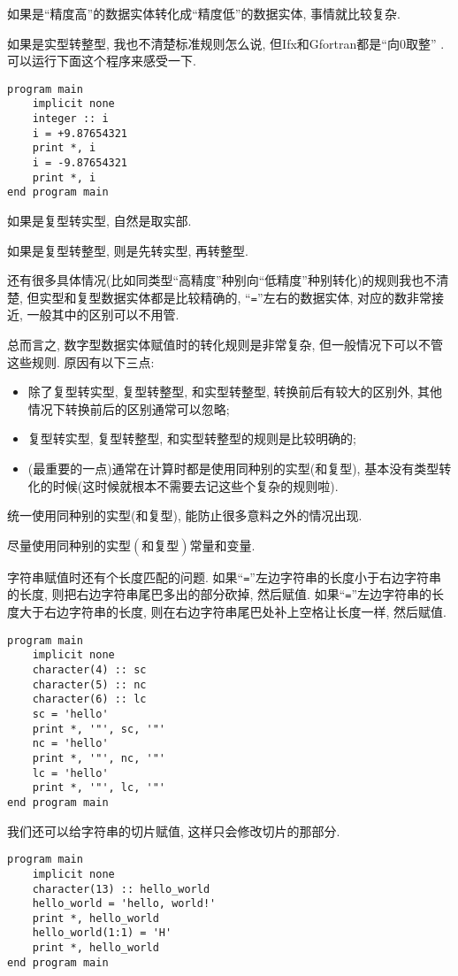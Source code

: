 如果是``精度高''的数据实体转化成``精度低''的数据实体, 事情就比较复杂.

如果是实型转整型, 我也不清楚标准规则怎么说, 但Ifx和Gfortran都是``向0取整'' . 可以运行下面这个程序来感受一下.
\begin{lstlisting}
program main
    implicit none
    integer :: i
    i = +9.87654321
    print *, i
    i = -9.87654321
    print *, i
end program main
\end{lstlisting}

如果是复型转实型, 自然是取实部.

如果是复型转整型, 则是先转实型, 再转整型.

还有很多具体情况(比如同类型``高精度''种别向``低精度''种别转化)的规则我也不清楚, 但实型和复型数据实体都是比较精确的, ``\texttt{=}''左右的数据实体, 对应的数非常接近, 一般其中的区别可以不用管.

总而言之, 数字型数据实体赋值时的转化规则是非常复杂, 但一般情况下可以不管这些规则. 原因有以下三点:
\begin{itemize}
    \item 除了复型转实型, 复型转整型, 和实型转整型, 转换前后有较大的区别外, 其他情况下转换前后的区别通常可以忽略;
    \item 复型转实型, 复型转整型, 和实型转整型的规则是比较明确的;
    \item (最重要的一点)通常在计算时都是使用同种别的实型(和复型), 基本没有类型转化的时候(这时候就根本不需要去记这些个复杂的规则啦).
\end{itemize}

统一使用同种别的实型(和复型), 能防止很多意料之外的情况出现.

\begin{convention}\label{fortran_use_real}
    尽量使用同种别的实型$(\text{和复型})$常量和变量.
\end{convention}

字符串赋值时还有个长度匹配的问题. 如果``\texttt{=}''左边字符串的长度小于右边字符串的长度, 则把右边字符串尾巴多出的部分砍掉, 然后赋值. 如果``\texttt{=}''左边字符串的长度大于右边字符串的长度, 则在右边字符串尾巴处补上空格让长度一样, 然后赋值.
\begin{lstlisting}
program main
    implicit none
    character(4) :: sc
    character(5) :: nc
    character(6) :: lc
    sc = 'hello'
    print *, '"', sc, '"'
    nc = 'hello'
    print *, '"', nc, '"'
    lc = 'hello'
    print *, '"', lc, '"'
end program main
\end{lstlisting}
我们还可以给字符串的切片赋值, 这样只会修改切片的那部分.
\begin{lstlisting}
program main
    implicit none
    character(13) :: hello_world
    hello_world = 'hello, world!'
    print *, hello_world
    hello_world(1:1) = 'H'
    print *, hello_world
end program main
\end{lstlisting}

